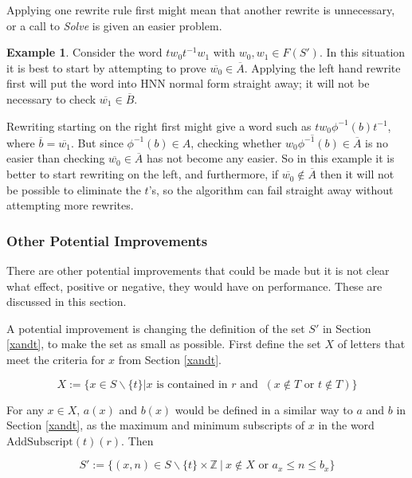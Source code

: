 \documentclass[12pt]{article} %
\theoremstyle{definition}
\theoremstyle{definition}
\theoremstyle{definition}
\theoremstyle{definition}
\theoremstyle{definition}
\theoremstyle{definition}
\newtheorem{exmpl}{Example}[theorem]
\begin{document}
Applying one rewrite rule first
might mean that another rewrite is unnecessary, or a call to \textit{Solve} is
given an easier problem.

\begin{exmpl}\label{rtlbad}
Consider the word $tw_0t^{-1}w_1$ with $w_0, w_1 \in F(S')$. In this situation
it is best to start by attempting to prove $\overline{w_0} \in \overline{A}$.
Applying the left hand rewrite first will put the word into HNN normal form
straight away; it will not be necessary to check $\overline{w_1} \in \overline{B}$.

Rewriting starting on the right first might give a word such as
$tw_0 \phi^{-1}(b)t^{-1}$, where $\overline{b} = \overline{w_1}$. But since
$\phi^{-1}(b) \in A$, checking whether $\overline{w_0\phi^{-1}(b)} \in \overline{A}$ is
no easier than checking $\overline{w_0} \in \overline{A}$ has not become
any easier. So in this example it is better to start rewriting on the left, and furthermore,
if $\overline{w_0} \notin \overline{A}$ then it will not be possible to eliminate the $t$'s, so the
algorithm can fail straight away without attempting more rewrites.

\subsubsection{Other Potential Improvements}

There are other potential improvements that could be made but it is not clear
what effect, positive or negative, they would have on performance. These are discussed
in this section.

A potential improvement is changing the definition of the set $S'$ in Section \ref{xandt},
to make the set as small as possible.
First define the set $X$
of letters that meet the criteria for $x$ from Section \ref{xandt}.

\begin{equation}
  X := \{ x \in S \backslash \{t\} |
    x \text{ is contained in }r \text{ and } \ (x \notin T \text{ or } t \notin T) \}
\end{equation}

For any $x \in X$, $a(x)$ and $b(x)$ would be defined in a similar way to $a$ and
$b$ in Section \ref{xandt}, as the maximum and minimum subscripts of $x$ in the word
$\text{AddSubscript}(t)(r)$. Then

\begin{equation}
  S' := \{(x, n) \in S \backslash \{t\} \times \mathbb{Z} \
| \ x \notin X \text{ or } a_x \le n \le b_x \}
\end{equation}


\end{exmpl}
\end{document}
